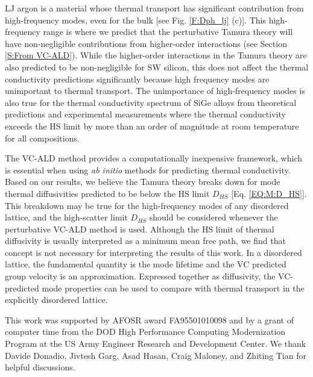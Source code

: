 \documentclass[aps,prb,onecolumn,preprint,footinbib,superscriptaddress,amsmath,amssymb,floatfix]{revtex4}
\begin{document}
LJ argon is a material whose thermal transport has significant 
contribution from high-frequency modes, even for the bulk 
[see Fig. \ref{F:Dph_lj} (c)]. 
This high-frequency range is where we predict that the 
perturbative Tamura theory   
will have non-negligible contributions from higher-order 
interactions (see Section \ref{S:From VC-ALD}). 
While the higher-order interactions in the 
Tamura theory are also predicted to be 
non-negligible for SW silicon, this does not affect the thermal 
conductivity predictions significantly because high frequency modes  
are unimportant to thermal transport. The unimportance of 
high-frequency modes is also 
true for the thermal conductivity spectrum of SiGe alloys 
from theoretical predictions
\cite{abeles_lattice_1963,garg_role_2011,ward_intrinsic_2010} and 
experimental measurements where the thermal conductivity 
exceeds the HS limit by more than
an order of magnitude at room temperature for all compositions.
\cite{cahill_lattice_1988,cahill_thermal_2004,
cahill_thermal_2005,cheaito_experimental_2012}

The VC-ALD method provides a computationally inexpensive framework, 
which is 
essential when using \emph{ab initio} 
methods for predicting thermal conductivity.
\cite{ward_intrinsic_2010,lindsay_thermal_2012,
garg_role_2011,
shiga_microscopic_2012,tian_phonon_2012,
shiomi_thermal_2011,esfarjani_heat_2011,
li_thermal_2012,luckyanova_coherent_2012} Based on our results, 
we believe the Tamura theory breaks down for mode thermal 
diffusivities predicted to be below the HS limit $D_{HS}$ 
[Eq. \eqref{EQ:M:D_HS}]. 
This breakdown may be true for the high-frequency modes of any 
disordered lattice,\cite{sheng_heat_1991} 
and the high-scatter limit $D_{HS}$ should be 
considered whenever the perturbative VC-ALD method is used.
Although the HS limit of thermal 
diffusivity is usually interpreted as a minimum mean free path,
\cite{kittel_interpretation_1949,graebner_phonon_1986,
cahill_lattice_1988,sheng_heat_1991} 
we find that concept is not necessary for interpreting the results 
of this work. In a disordered lattice, the fundamental quantity is 
the mode lifetime\cite{sheng_heat_1991,taraskin_determination_1999} and the 
VC predicted group velocity is an approximation. Expressed together as 
diffusivity, the VC-predicted mode properties can be used to 
compare with thermal transport in the explicitly disordered lattice.

\begin{acknowledgements}
This work was supported by AFOSR award FA95501010098 and by a grant 
of computer time from the DOD 
High Performance Computing Modernization Program at the US Army Engineer 
Research and Development Center. 
We thank Davide Donadio, Jivtesh Garg, Asad Hasan, Craig Maloney, 
and Zhiting Tian for helpful discussions.
\end{acknowledgements}
\end{document}
